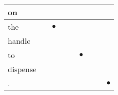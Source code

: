 \documentclass[landscape]{article}
\newcommand{\ssp}{\hspace{2pt}}
\newcommand{\mex}{\cellcolor{g}$\bullet$}
\begin{document}
\begin{tabular}{|l|p{10pt}|p{10pt}|p{10pt}|p{10pt}|p{10pt}|p{10pt}|p{10pt}|p{10pt}|}
\hline
\ssp on \ssp&\hspace{2pt}&\hspace{2pt}&\hspace{2pt}&\hspace{2pt}&\hspace{2pt}&\hspace{2pt}&\hspace{2pt}&\hspace{2pt}\\
\hline
\ssp \cellcolor{ref1}the \ssp&\hspace{2pt}&\hspace{2pt}\mex&\hspace{2pt}&\hspace{2pt}&\hspace{2pt}&\hspace{2pt}&\hspace{2pt}&\hspace{2pt}\\
\hline
\ssp handle \ssp&\hspace{2pt}&\hspace{2pt}&\hspace{2pt}&\hspace{2pt}&\hspace{2pt}&\hspace{2pt}&\hspace{2pt}&\hspace{2pt}\\
\hline
\ssp \cellcolor{ref4}to \ssp&\hspace{2pt}&\hspace{2pt}&\hspace{2pt}&\hspace{2pt}&\hspace{2pt}\mex&\hspace{2pt}&\hspace{2pt}&\hspace{2pt}\\
\hline
\ssp dispense \ssp&\hspace{2pt}&\hspace{2pt}&\hspace{2pt}&\hspace{2pt}&\hspace{2pt}&\hspace{2pt}&\hspace{2pt}&\hspace{2pt}\\
\hline
\ssp \cellcolor{ref7}. \ssp&\hspace{2pt}&\hspace{2pt}&\hspace{2pt}&\hspace{2pt}&\hspace{2pt}&\hspace{2pt}&\hspace{2pt}&\hspace{2pt}\mex\\
\hline
\end{tabular}
\end{document}
